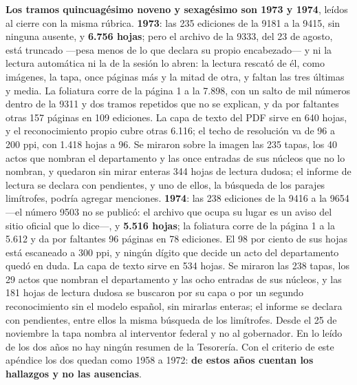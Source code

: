 \textbf{Los tramos quincuagésimo noveno y sexagésimo son 1973 y 1974}, leídos al cierre con la misma rúbrica. \textbf{1973}: las 235 ediciones de la 9181 a la 9415, sin ninguna ausente, y \textbf{6.756 hojas}; pero el archivo de la 9333, del 23 de agosto, está truncado ---pesa menos de lo que declara su propio encabezado--- y ni la lectura automática ni la de la sesión lo abren: la lectura rescató de él, como imágenes, la tapa, once páginas más y la mitad de otra, y faltan las tres últimas y media. La foliatura corre de la página 1 a la 7.898, con un salto de mil números dentro de la 9311 y dos tramos repetidos que no se explican, y da por faltantes otras 157 páginas en 109 ediciones. La capa de texto del PDF sirve en 640 hojas, y el reconocimiento propio cubre otras 6.116; el techo de resolución va de 96 a 200 ppi, con 1.418 hojas a 96. Se miraron sobre la imagen las 235 tapas, los 40 actos que nombran el departamento y las once entradas de sus núcleos que no lo nombran, y quedaron sin mirar enteras 344 hojas de lectura dudosa; el informe de lectura se declara con pendientes, y uno de ellos, la búsqueda de los parajes limítrofes, podría agregar menciones. \textbf{1974}: las 238 ediciones de la 9416 a la 9654 ---el número 9503 no se publicó: el archivo que ocupa su lugar es un aviso del sitio oficial que lo dice---, y \textbf{5.516 hojas}; la foliatura corre de la página 1 a la 5.612 y da por faltantes 96 páginas en 78 ediciones. El 98 por ciento de sus hojas está escaneado a 300 ppi, y ningún dígito que decide un acto del departamento quedó en duda. La capa de texto sirve en 534 hojas. Se miraron las 238 tapas, los 29 actos que nombran el departamento y las ocho entradas de sus núcleos, y las 181 hojas de lectura dudosa se buscaron por su capa o por un segundo reconocimiento sin el modelo español, sin mirarlas enteras; el informe se declara con pendientes, entre ellos la misma búsqueda de los limítrofes. Desde el 25 de noviembre la tapa nombra al interventor federal y no al gobernador. En lo leído de los dos años no hay ningún resumen de la Tesorería. Con el criterio de este apéndice los dos quedan como 1958 a 1972: \textbf{de estos años cuentan los hallazgos y no las ausencias}.

